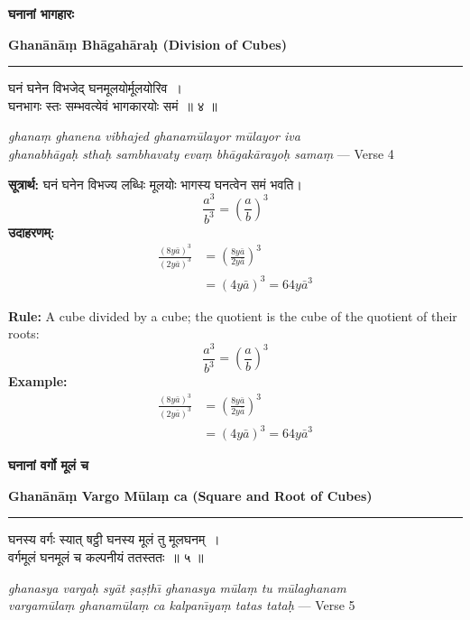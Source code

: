 \documentclass[11pt,a4paper]{article}
\newcommand{\dev}[1]{{\devanagarifont #1}}
\newcommand{\bicol}[2]{%
\noindent%
\begin{minipage}[t]{0.48\textwidth}
\begin{flushleft}
\small
#1
\end{flushleft}
\end{minipage}%
\hfill%
\begin{minipage}[t]{0.48\textwidth}
\begin{flushleft}
\small
#2
\end{flushleft}
\end{minipage}%
\vspace{0.4em}
}
\newcommand{\bicolverse}[2]{%
\par\noindent%
\begin{minipage}[t]{0.48\textwidth}
\centering
\color{versecolor}
\devanagarifont
\small
#1
\end{minipage}%
\hfill%
\begin{minipage}[t]{0.48\textwidth}
\centering
\color{versecolor}
\small
#2
\end{minipage}%
\par\vspace{0.4em}
}
\newcommand{\sectionbicol}[2]{%
\vspace{0.5em}
\noindent%
\begin{minipage}[t]{0.48\textwidth}
\begin{center}
\large\bfseries\color{sectioncolor}
\dev{#1}
\end{center}
\end{minipage}%
\hfill%
\begin{minipage}[t]{0.48\textwidth}
\begin{center}
\large\bfseries\color{sectioncolor}
#2
\end{center}
\end{minipage}%
\vspace{0.3em}
\noindent\rule{\textwidth}{0.4pt}
}
\begin{document}
\clearpage

\sectionbicol{घनानां भागहारः}{Ghan\={a}n\={a}\d{m} Bh\={a}gah\={a}ra\d{h} (Division of Cubes)}

\vspace{0.3cm}

\bicolverse{%
घनं घनेन विभजेद् घनमूलयोर्मूलयोरिव~।\\
घनभागः स्तः सम्भवत्येवं भागकारयोः समं~॥ ४ ॥
}{%
\textit{ghana\d{m} ghanena vibhajed ghanam\={u}layor m\={u}layor iva}\\
\textit{ghanabh\={a}ga\d{h} stha\d{h} sambhavaty eva\d{m} bh\={a}gak\={a}rayo\d{h} sama\d{m}} --- Verse 4
}

\vspace{0.5cm}

\bicol{%
\textbf{सूत्रार्थ:} घनं घनेन विभज्य लब्धिः मूलयोः भागस्य घनत्वेन समं भवति।
\[\frac{a^3}{b^3} = \left(\frac{a}{b}\right)^3\]
\textbf{उदाहरणम्:}
\begin{align*}
\frac{(8y\bar{a})^3}{(2y\bar{a})^3} &= \left(\frac{8y\bar{a}}{2y\bar{a}}\right)^3 \\
&= (4y\bar{a})^3 = 64y\bar{a}^3
\end{align*}
}{%
\textbf{Rule:} A cube divided by a cube; the quotient is the cube of the quotient of their roots:
\[\frac{a^3}{b^3} = \left(\frac{a}{b}\right)^3\]
\textbf{Example:}
\begin{align*}
\frac{(8y\bar{a})^3}{(2y\bar{a})^3} &= \left(\frac{8y\bar{a}}{2y\bar{a}}\right)^3 \\
&= (4y\bar{a})^3 = 64y\bar{a}^3
\end{align*}
}

\clearpage

\sectionbicol{घनानां वर्गो मूलं च}{Ghan\={a}n\={a}\d{m} Vargo M\={u}la\d{m} ca (Square and Root of Cubes)}

\vspace{0.3cm}

\bicolverse{%
घनस्य वर्गः स्यात् षट्ठी घनस्य मूलं तु मूलघनम्~।\\
वर्गमूलं घनमूलं च कल्पनीयं ततस्ततः~॥ ५ ॥
}{%
\textit{ghanasya varga\d{h} sy\={a}t \d{s}a\d{s}\d{t}h\={\i} ghanasya m\={u}la\d{m} tu m\={u}laghanam}\\
\textit{vargam\={u}la\d{m} ghanam\={u}la\d{m} ca kalpan\={\i}ya\d{m} tatas tata\d{h}} --- Verse 5
}
\end{document}
